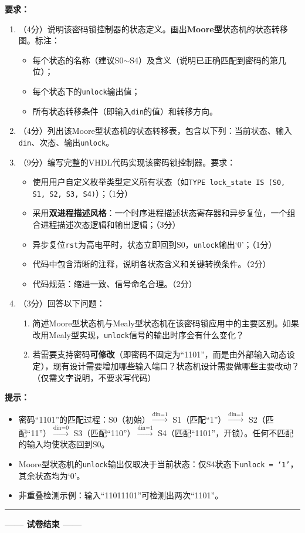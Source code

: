 \textbf{要求：}
\begin{enumerate}[label=(\arabic*)]
  \item （4分）说明该密码锁控制器的状态定义。画出\textbf{Moore型}状态机的状态转移图。标注：
  \begin{itemize}
    \item 每个状态的名称（建议S0$\sim$S4）及含义（说明已正确匹配到密码的第几位）；
    \item 每个状态下的\texttt{unlock}输出值；
    \item 所有状态转移条件（即输入\texttt{din}的值）和转移方向。
  \end{itemize}
  \item （4分）列出该Moore型状态机的状态转移表，包含以下列：当前状态、输入\texttt{din}、次态、输出\texttt{unlock}。
  \item （9分）编写完整的VHDL代码实现该密码锁控制器。要求：
  \begin{itemize}
    \item 使用用户自定义枚举类型定义所有状态（如\texttt{TYPE lock\_state IS (S0, S1, S2, S3, S4)}）；（1分）
    \item 采用\textbf{双进程描述风格}：一个时序进程描述状态寄存器和异步复位，一个组合进程描述次态逻辑和输出逻辑；（3分）
    \item 异步复位\texttt{rst}为高电平时，状态立即回到S0，\texttt{unlock}输出`0'；（1分）
    \item 代码中包含清晰的注释，说明各状态含义和关键转换条件。（2分）
    \item 代码规范：缩进一致、信号命名合理。（2分）
  \end{itemize}
  \item （3分）回答以下问题：
  \begin{enumerate}
    \item 简述Moore型状态机与Mealy型状态机在该密码锁应用中的主要区别。如果改用Mealy型实现，\texttt{unlock}信号的输出时序会有什么变化？
    \item 若需要支持密码\textbf{可修改}（即密码不固定为``1101''，而是由外部输入动态设定），现有设计需要增加哪些输入端口？状态机设计需要做哪些主要改动？（仅需文字说明，不要求写代码）
  \end{enumerate}
\end{enumerate}

\begin{framed}
\textbf{提示：}
\begin{itemize}
  \item 密码``1101''的匹配过程：S0（初始）$\xrightarrow{\text{din=1}}$ S1（匹配``1''）$\xrightarrow{\text{din=1}}$ S2（匹配``11''）$\xrightarrow{\text{din=0}}$ S3（匹配``110''）$\xrightarrow{\text{din=1}}$ S4（匹配``1101''，开锁）。任何不匹配的输入均使状态回到S0。
  \item Moore型状态机的\texttt{unlock}输出仅取决于当前状态：仅S4状态下\texttt{unlock = `1'}，其余状态均为`0'。
  \item 非重叠检测示例：输入``11011101''可检测出两次``1101''。
\end{itemize}
\end{framed}

\vspace{0.3cm}

{\centering
\rule{0.8\textwidth}{0.5pt}
\vspace{0.3cm}

\textbf{—— 试卷结束 ——}

\vspace{0.5cm}}

\endinput
